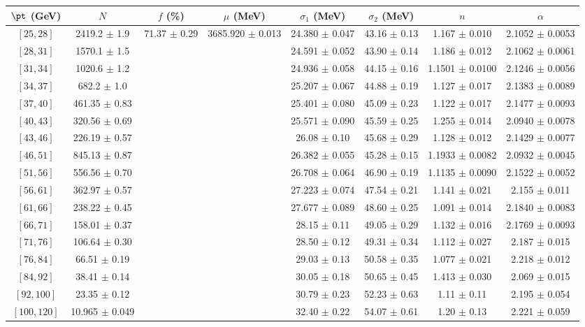 \begin{tabular}{c||c|c|c|c|c|c|c}
$\pt$ (GeV) & $N$ & $f$ (\%) & $\mu$ (MeV) & $\sigma_1$ (MeV) & $\sigma_2$ (MeV) & $n$ & $\alpha$ \\
\hline
$[25, 28]$ & 2419.2 $\pm$ 1.9 & \multirow{17}{*}{71.37 $\pm$ 0.29} & \multirow{17}{*}{3685.920 $\pm$ 0.013} & 24.380 $\pm$ 0.047 & 43.16 $\pm$ 0.13 & 1.167 $\pm$ 0.010 & 2.1052 $\pm$ 0.0053\\
$[28, 31]$ & 1570.1 $\pm$ 1.5 &  &  & 24.591 $\pm$ 0.052 & 43.90 $\pm$ 0.14 & 1.186 $\pm$ 0.012 & 2.1062 $\pm$ 0.0061\\
$[31, 34]$ & 1020.6 $\pm$ 1.2 &  &  & 24.936 $\pm$ 0.058 & 44.15 $\pm$ 0.16 & 1.1501 $\pm$ 0.0100 & 2.1246 $\pm$ 0.0056\\
$[34, 37]$ & 682.2 $\pm$ 1.0 &  &  & 25.207 $\pm$ 0.067 & 44.88 $\pm$ 0.19 & 1.127 $\pm$ 0.017 & 2.1383 $\pm$ 0.0089\\
$[37, 40]$ & 461.35 $\pm$ 0.83 &  &  & 25.401 $\pm$ 0.080 & 45.09 $\pm$ 0.23 & 1.122 $\pm$ 0.017 & 2.1477 $\pm$ 0.0093\\
$[40, 43]$ & 320.56 $\pm$ 0.69 &  &  & 25.571 $\pm$ 0.090 & 45.59 $\pm$ 0.25 & 1.255 $\pm$ 0.014 & 2.0940 $\pm$ 0.0078\\
$[43, 46]$ & 226.19 $\pm$ 0.57 &  &  & 26.08 $\pm$ 0.10 & 45.68 $\pm$ 0.29 & 1.128 $\pm$ 0.012 & 2.1429 $\pm$ 0.0077\\
$[46, 51]$ & 845.13 $\pm$ 0.87 &  &  & 26.382 $\pm$ 0.055 & 45.28 $\pm$ 0.15 & 1.1933 $\pm$ 0.0082 & 2.0932 $\pm$ 0.0045\\
$[51, 56]$ & 556.56 $\pm$ 0.70 &  &  & 26.708 $\pm$ 0.064 & 46.90 $\pm$ 0.19 & 1.1135 $\pm$ 0.0090 & 2.1522 $\pm$ 0.0052\\
$[56, 61]$ & 362.97 $\pm$ 0.57 &  &  & 27.223 $\pm$ 0.074 & 47.54 $\pm$ 0.21 & 1.141 $\pm$ 0.021 & 2.155 $\pm$ 0.011\\
$[61, 66]$ & 238.22 $\pm$ 0.45 &  &  & 27.677 $\pm$ 0.089 & 48.60 $\pm$ 0.25 & 1.091 $\pm$ 0.014 & 2.1840 $\pm$ 0.0083\\
$[66, 71]$ & 158.01 $\pm$ 0.37 &  &  & 28.15 $\pm$ 0.11 & 49.05 $\pm$ 0.29 & 1.132 $\pm$ 0.016 & 2.1769 $\pm$ 0.0093\\
$[71, 76]$ & 106.64 $\pm$ 0.30 &  &  & 28.50 $\pm$ 0.12 & 49.31 $\pm$ 0.34 & 1.112 $\pm$ 0.027 & 2.187 $\pm$ 0.015\\
$[76, 84]$ & 66.51 $\pm$ 0.19 &  &  & 29.03 $\pm$ 0.13 & 50.58 $\pm$ 0.35 & 1.077 $\pm$ 0.021 & 2.218 $\pm$ 0.012\\
$[84, 92]$ & 38.41 $\pm$ 0.14 &  &  & 30.05 $\pm$ 0.18 & 50.65 $\pm$ 0.45 & 1.413 $\pm$ 0.030 & 2.069 $\pm$ 0.015\\
$[92, 100]$ & 23.35 $\pm$ 0.12 &  &  & 30.79 $\pm$ 0.23 & 52.23 $\pm$ 0.63 & 1.11 $\pm$ 0.11 & 2.195 $\pm$ 0.054\\
$[100, 120]$ & 10.965 $\pm$ 0.049 &  &  & 32.40 $\pm$ 0.22 & 54.07 $\pm$ 0.61 & 1.20 $\pm$ 0.13 & 2.221 $\pm$ 0.059\\
\end{tabular}
